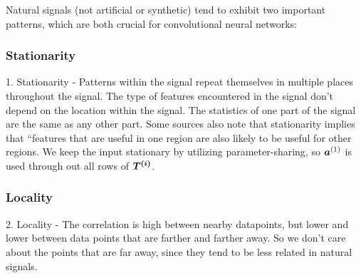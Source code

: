 Natural signals (not artificial or synthetic) tend to exhibit two important patterns, which are both crucial for convolutional neural networks:

\subsubsection{Stationarity}
1. Stationarity - Patterns within the signal repeat themselves in multiple places throughout the signal.
The type of features encountered in the signal don’t depend on the location within the signal. The statistics of one part of the signal are the same as any other part. Some sources also note that stationarity implies that “features that are useful in one region are also likely to be useful for other regions. We keep the input stationary by utilizing parameter-sharing, so $\vect{a}^{(1)}$ is used through out all rows of $\matr{T^{(i)}}$.

\subsubsection{Locality}
2. Locality - The correlation is high between nearby datapoints, but lower and lower between data points that are farther and farther away.
So we don't care about the points that are far away, since they tend to be less related in natural signals.
